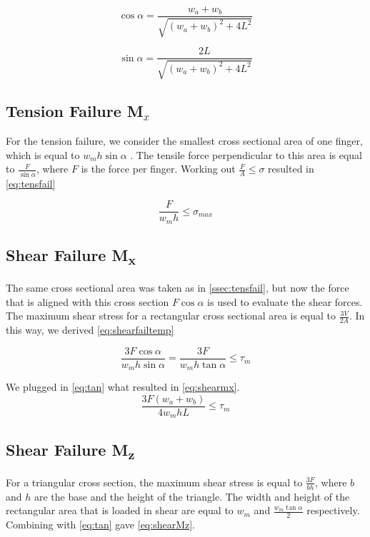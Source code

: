 \begin{equation}
	\label{eq:cos}
	\cos \alpha = \frac{w_a + w_b}{\sqrt{ \left( w_a + w_b \right) ^2 + 4L ^2 }}
\end{equation}

\begin{equation}
	\label{eq:sin}
	\sin \alpha = \frac{2L}{\sqrt{ \left( w_a + w_b \right) ^2 + 4L ^2 }}
\end{equation}


\subsection{Tension Failure M$_x$}\label{ssec:tensfail}
For the tension failure, we consider the smallest cross sectional area of one finger, which is equal to $w_m h \sin \alpha$ . The tensile force perpendicular to this area is equal to $\frac{F}{\sin \alpha}$, where $F$ is the force per finger. %
Working out $\frac{F}{A} \le \sigma$ resulted in \autoref{eq:tensfail}


\begin{equation}
		\label{eq:tensfail}
	\frac{F}{w_m  h} \le \sigma_{max}
\end{equation}


\subsection{Shear Failure M\textsubscript{x}}
The same cross sectional area was taken as in \autoref{ssec:tensfail}, but now the force that is aligned with this cross section $F \cos \alpha$ is used to evaluate the shear forces. The maximum shear stress for a rectangular cross sectional area is equal to $\frac{3V}{2A}$. In this way, we derived \autoref{eq:shearfailtemp}

\begin{equation}
	\label{eq:shearfailtemp}
	\frac{3F \cos \alpha}{w_m h \sin \alpha} = \frac{3F }{w_m h \tan \alpha} \le \tau_m
\end{equation}

We plugged in \autoref{eq:tan} what resulted in \autoref{eq:shearmx}.
\begin{equation}
	\label{eq:shearmx}
	\frac{ 3 F \left(w_a + w_b \right) }{ 4  w_m h L} \le \tau_m	
\end{equation}

\subsection{Shear Failure M\textsubscript{z}}
For a triangular cross section, the maximum shear stress is equal to $\frac{3F}{bh}$, where $b$ and $h$ are the base and the height of the triangle. The width and height of the rectangular area that is loaded in shear are equal to $w_m$ and $\frac{w_m \tan \alpha}{2} $ respectively. Combining with \ref{eq:tan} gave \autoref{eq:shearMz}.

